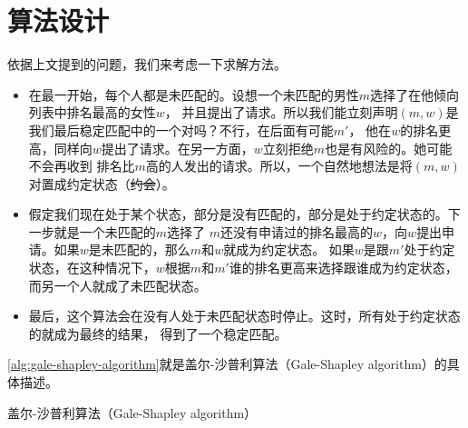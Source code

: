 \section{算法设计}\label{sec:stable-matching-algorithm}
    依据上文提到的问题，我们来考虑一下求解方法。
    \begin{itemize}[label=$\ast$]
        \item 在最一开始，每个人都是未匹配的。设想一个未匹配的男性$m$选择了在他倾向列表中排名最高的女性$w$，
            并且提出了请求。所以我们能立刻声明$(m,w)$是我们最后稳定匹配中的一个对吗？不行，在后面有可能$m'$，
            他在$w$的排名更高，同样向$w$提出了请求。在另一方面，$w$立刻拒绝$m$也是有风险的。她可能不会再收到
            排名比$m$高的人发出的请求。所以，一个自然地想法是将$(m,w)$对置成约定状态（\sout{约会}）。
        \item 假定我们现在处于某个状态，部分是没有匹配的，部分是处于约定状态的。下一步就是一个未匹配的$m$选择了
            $m$还没有申请过的排名最高的$w$，向$w$提出申请。如果$w$是未匹配的，那么$m$和$w$就成为约定状态。
            如果$w$是跟$m'$处于约定状态，在这种情况下，$w$根据$m$和$m'$谁的排名更高来选择跟谁成为约定状态，
            而另一个人就成了未匹配状态。
        \item 最后，这个算法会在没有人处于未匹配状态时停止。这时，所有处于约定状态的就成为最终的结果，
            得到了一个稳定匹配。
    \end{itemize}
    \autoref{alg:gale-shapley-algorithm}就是盖尔-沙普利算法（Gale-Shapley algorithm）的具体描述。
    \begin{algorithm}
        \caption{盖尔-沙普利算法（Gale-Shapley algorithm）}\label{alg:gale-shapley-algorithm}
    \end{algorithm}

